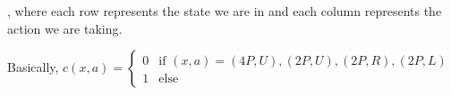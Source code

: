 \documentclass{article}
\begin{document}
\medskip

, where each row represents the state we are in and each column represents the action we are taking.

\medskip

Basically, $c(x, a) = \left\{\begin{array}{ll}
    0 & \text{if } (x, a) = (4P, U), (2P, U), (2P, R), (2P, L) \\
    1 & \text{else}
\end{array}
\right.$

\subsection{}
\end{document}
